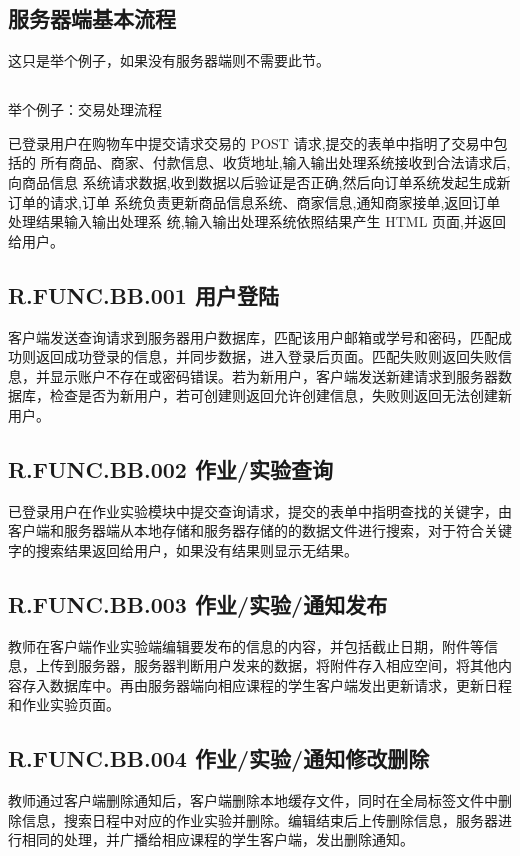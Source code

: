 \subsection{服务器端基本流程}
这只是举个例子，如果没有服务器端则不需要此节。

\subsection{}
举个例子：交易处理流程

已登录用户在购物车中提交请求交易的 POST 请求,提交的表单中指明了交易中包括的
所有商品、商家、付款信息、收货地址,输入输出处理系统接收到合法请求后,向商品信息
系统请求数据,收到数据以后验证是否正确,然后向订单系统发起生成新订单的请求,订单
系统负责更新商品信息系统、商家信息,通知商家接单,返回订单处理结果输入输出处理系
统,输入输出处理系统依照结果产生 HTML 页面,并返回给用户。

\subsection{R.FUNC.BB.001   用户登陆}
客户端发送查询请求到服务器用户数据库，匹配该用户邮箱或学号和密码，匹配成功则返回成功登录的信息，并同步数据，进入登录后页面。匹配失败则返回失败信息，并显示账户不存在或密码错误。若为新用户，客户端发送新建请求到服务器数据库，检查是否为新用户，若可创建则返回允许创建信息，失败则返回无法创建新用户。

\subsection{R.FUNC.BB.002   作业/实验查询}
已登录用户在作业实验模块中提交查询请求，提交的表单中指明查找的关键字，由客户端和服务器端从本地存储和服务器存储的的数据文件进行搜索，对于符合关键字的搜索结果返回给用户，如果没有结果则显示无结果。

\subsection{R.FUNC.BB.003   作业/实验/通知发布}
教师在客户端作业实验端编辑要发布的信息的内容，并包括截止日期，附件等信息，上传到服务器，服务器判断用户发来的数据，将附件存入相应空间，将其他内容存入数据库中。再由服务器端向相应课程的学生客户端发出更新请求，更新日程和作业实验页面。

\subsection{R.FUNC.BB.004   作业/实验/通知修改删除}
教师通过客户端删除通知后，客户端删除本地缓存文件，同时在全局标签文件中删除信息，搜索日程中对应的作业实验并删除。编辑结束后上传删除信息，服务器进行相同的处理，并广播给相应课程的学生客户端，发出删除通知。

